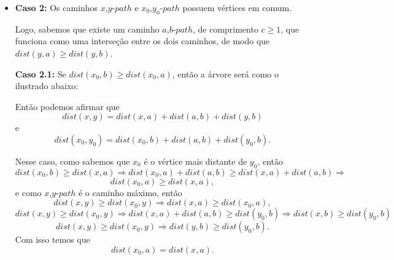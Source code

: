 \documentclass[a4paper,12pt]{article}
\begin{document}
\begin{itemize}
			\bigskip
			\bigskip
			\bigskip

			\item \textbf{Caso 2:} Os caminhos $x$,$y$-$path$ e 
            $x_0$,$y_0$-$path$ possuem vértices em comum.
         	
         	Logo, sabemos que existe um caminho $a$,$b$-$path$, 
            de comprimento $c \ge 1$,
            que funciona como uma interseção entre os dois 
            caminhos, de modo que $dist(y,a)\ge dist(y,b)$.
            
            
            \bigskip

            \textbf{Caso 2.1:} Se 
            $dist(x_0,b)\ge dist(x_0,a)$, então a árvore será
            como o ilustrado abaixo:

			
			Então podemos afirmar que 
			$$ dist(x,y) = dist(x,a) + dist(a,b) + dist(y,b) $$ e
            $$ dist(x_0,y_0) = dist(x_0,b) + dist(a,b) + 
            dist(y_0,b).$$

			Nesse caso, como sabemos que $x_0$ é o vértice mais
			distante de $y_0$, então
			$$  dist(x_0,b)\ge dist(x,a) \Rightarrow 
			dist(x_0,a) + dist(a,b)\ge dist(x,a) + dist(a,b)
			\Rightarrow$$ 
			$$ dist(x_0,a)\ge dist(x,a), $$
			e como $x$,$y$-$path$ é o caminho máximo, então
			$$  dist(x,y)\ge dist(x_0,y) \Rightarrow 
			dist(x,a)\ge dist(x_0,a), $$ 
			$$  dist(x,y)\ge dist(x_0,y) \Rightarrow 
			dist(x,a) + dist(a,b)\ge dist(y_0,b)\Rightarrow
			dist(x,b)\ge dist(y_0,b) $$
			$$  dist(x,y)\ge dist(x_0,y) \Rightarrow 
			dist(y,b)\ge dist(y_0,b). $$
			Com isso temos que $$dist(x_0,a)=dist(x,a).$$


\end{itemize}
\end{document}
